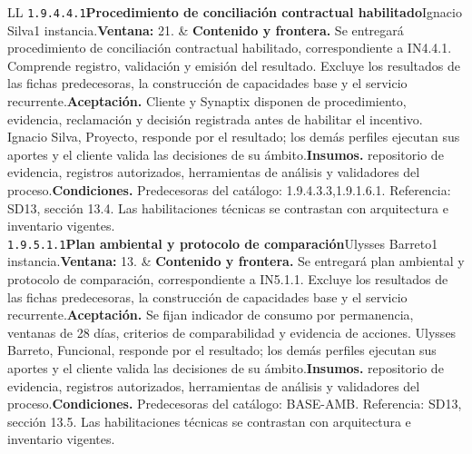 \begin{longtable}{L{\tabcolsep\relax}L{\tabcolsep\relax}}
\texttt{1.\allowbreak{}9.\allowbreak{}4.\allowbreak{}4.\allowbreak{}1}\newline{}\textbf{Procedimiento de conciliación contractual habilitado}\newline{}Ignacio Silva\newline{}1 instancia.\newline{}\textbf{Ventana:} 21. & \textbf{Contenido y frontera.} Se entregará procedimiento de conciliación contractual habilitado, correspondiente a IN4.4.1. Comprende registro, validación y emisión del resultado. Excluye los resultados de las fichas predecesoras, la construcción de capacidades base y el servicio recurrente.\newline{}\textbf{Aceptación.} Cliente y Synaptix disponen de procedimiento, evidencia, reclamación y decisión registrada antes de habilitar el incentivo. Ignacio Silva, Proyecto, responde por el resultado; los demás perfiles ejecutan sus aportes y el cliente valida las decisiones de su ámbito.\newline{}\textbf{Insumos.} repositorio de evidencia, registros autorizados, herramientas de análisis y validadores del proceso.\newline{}\textbf{Condiciones.} Predecesoras del catálogo: 1.9.4.3.3,1.9.1.6.1. Referencia: SD13, sección 13.4. Las habilitaciones técnicas se contrastan con arquitectura e inventario vigentes.\\\hline
\texttt{1.\allowbreak{}9.\allowbreak{}5.\allowbreak{}1.\allowbreak{}1}\newline{}\textbf{Plan ambiental y protocolo de comparación}\newline{}Ulysses Barreto\newline{}1 instancia.\newline{}\textbf{Ventana:} 13. & \textbf{Contenido y frontera.} Se entregará plan ambiental y protocolo de comparación, correspondiente a IN5.1.1. Excluye los resultados de las fichas predecesoras, la construcción de capacidades base y el servicio recurrente.\newline{}\textbf{Aceptación.} Se fijan indicador de consumo por permanencia, ventanas de 28 días, criterios de comparabilidad y evidencia de acciones. Ulysses Barreto, Funcional, responde por el resultado; los demás perfiles ejecutan sus aportes y el cliente valida las decisiones de su ámbito.\newline{}\textbf{Insumos.} repositorio de evidencia, registros autorizados, herramientas de análisis y validadores del proceso.\newline{}\textbf{Condiciones.} Predecesoras del catálogo: BASE-AMB. Referencia: SD13, sección 13.5. Las habilitaciones técnicas se contrastan con arquitectura e inventario vigentes.\\\hline

\end{longtable}
